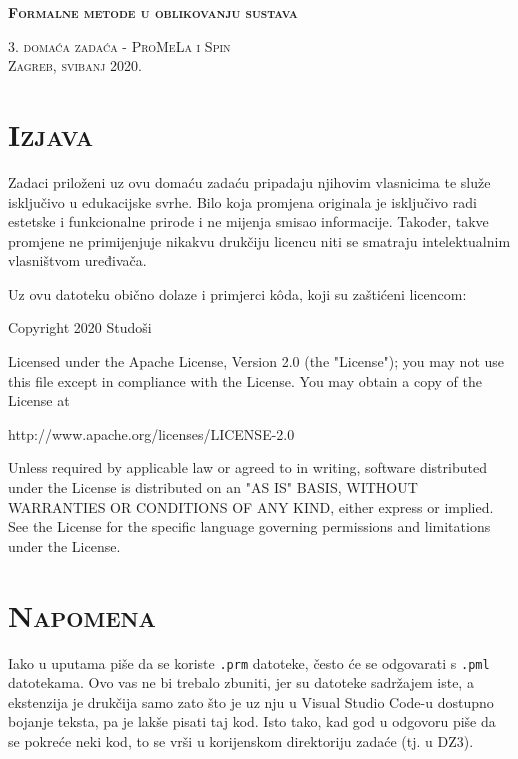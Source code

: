 \documentclass{article}
\newcommand{\crnotice}[1]
{
    \begin{center}
        \colorbox{red!15}{\parbox{\textwidth}{#1}}
    \end{center}
}
\newcommand{\sekcija}[1]{\section{\textsc{#1}}}
\begin{document}
\begin{titlepage}
    \centering
    \vspace*{\fill}

    \huge
    \textbf{\textsc{Formalne metode u oblikovanju sustava}} \\
    
    \vspace*{0.5cm}
    
    \large
    \textsc{3. domaća zadaća - ProMeLa i Spin} \\

    \vspace*{\fill}
    \textsc{Zagreb, svibanj 2020.}
\end{titlepage}

\tableofcontents
\pagebreak



\sekcija{Izjava}

Zadaci priloženi uz ovu domaću zadaću pripadaju njihovim vlasnicima te služe isključivo u edukacijske svrhe. Bilo koja promjena originala je isključivo radi estetske i funkcionalne prirode i ne mijenja smisao informacije. Također, takve promjene ne primijenjuje nikakvu drukčiju licencu niti se smatraju intelektualnim vlasništvom uređivača.
\newline

Uz ovu datoteku obično dolaze i primjerci kôda, koji su zaštićeni licencom:

\crnotice
{
    Copyright 2020 Studoši
    \newline

    Licensed under the Apache License, Version 2.0 (the "License");
    you may not use this file except in compliance with the License.
    You may obtain a copy of the License at
    \newline

        \quad
        http://www.apache.org/licenses/LICENSE-2.0
        \newline

    Unless required by applicable law or agreed to in writing, software
    distributed under the License is distributed on an "AS IS" BASIS,
    WITHOUT WARRANTIES OR CONDITIONS OF ANY KIND, either express or implied.
    See the License for the specific language governing permissions and
    limitations under the License.
}

\sekcija{Napomena}

Iako u uputama piše da se koriste \texttt{.prm} datoteke, često će se odgovarati s \texttt{.pml} datotekama. Ovo vas ne bi trebalo zbuniti, jer su datoteke sadržajem iste, a ekstenzija je drukčija samo zato što je uz nju u Visual Studio Code-u dostupno bojanje teksta, pa je lakše pisati taj kod. Isto tako, kad god u odgovoru piše da se pokreće neki kod, to se vrši u korijenskom direktoriju zadaće (tj. u DZ3).
\end{document}

